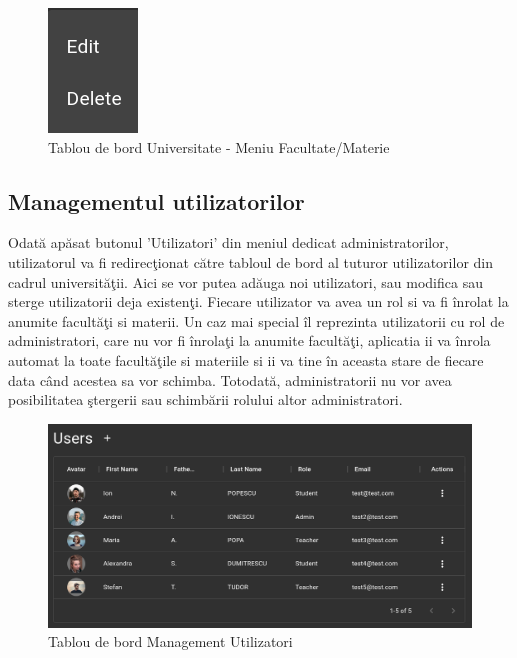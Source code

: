 \documentclass[12pt, a4paper, oneside, romanian]{teza-upb}
\begin{document}
\begin{figure}[H]
\centering
\includegraphics*[width=0.15\columnwidth]{tablou-de-bord-universitate-meniu-facultate}
\caption{Tablou de bord Universitate - Meniu Facultate/Materie}
\label{tablou-de-bord-universitate-meniu-facultate}
\end{figure}

\subsection{Managementul utilizatorilor}

Odată apăsat butonul 'Utilizatori' din meniul dedicat administratorilor, utilizatorul va fi redirecţionat către tabloul de bord al tuturor utilizatorilor din cadrul universităţii. Aici se vor putea adăuga noi utilizatori, sau modifica sau sterge utilizatorii deja existenţi. Fiecare utilizator va avea un rol si va fi înrolat la anumite facultăţi si materii. Un caz mai special îl reprezinta utilizatorii cu rol de administratori, care nu vor fi înrolaţi la anumite facultăţi, aplicatia ii va înrola automat la toate facultăţile si materiile si ii va tine în aceasta stare de fiecare data când acestea sa vor schimba. Totodată, administratorii nu vor avea posibilitatea ştergerii sau schimbării rolului altor administratori.

\begin{figure}[H]
\centering
\includegraphics*[width=\columnwidth]{tablou-de-bord-management-utilizatori}
\caption{Tablou de bord Management Utilizatori}
\label{tablou-de-bord-management-utilizatori}
\end{figure}
\end{document}
